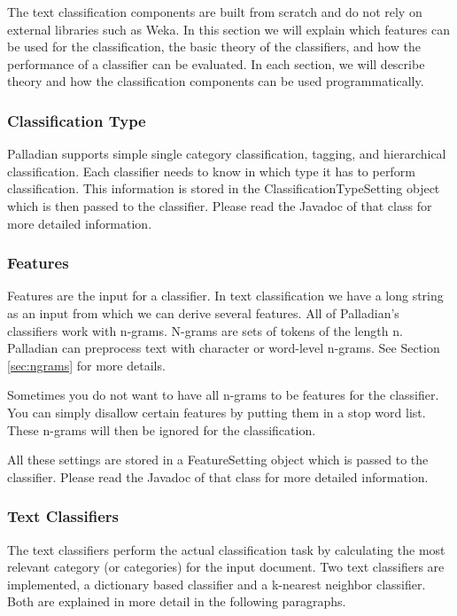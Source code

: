 The text classification components are built from scratch and do not rely on external libraries such as Weka. In this section we will explain which features can be used for the classification, the basic theory of the classifiers, and how the performance of a classifier can be evaluated. In each section, we will describe theory and how the classification components can be used programmatically.

\subsubsection{Classification Type}
Palladian supports simple single category classification, tagging, and hierarchical classification. Each classifier needs to know in which type it has to perform classification.
This information is stored in the ClassificationTypeSetting object which is then passed to the classifier. Please read the Javadoc of that class for more detailed information.

\subsubsection{Features}
Features are the input for a classifier. In text classification we have a long string as an input from which we can derive several features. All of Palladian's classifiers work with n-grams. N-grams are sets of tokens of the length n. Palladian can preprocess text with character or word-level n-grams. See Section \ref{sec:ngrams} for more details.

Sometimes you do not want to have all n-grams to be features for the classifier. You can simply disallow certain features by putting them in a stop word list. These n-grams will then be ignored for the classification.

All these settings are stored in a FeatureSetting object which is passed to the classifier. Please read the Javadoc of that class for more detailed information.

\subsubsection{Text Classifiers}
The text classifiers perform the actual classification task by calculating the most relevant category (or categories) for the input document. Two text classifiers are implemented, a dictionary based classifier and a k-nearest neighbor classifier. Both are explained in more detail in the following paragraphs.

